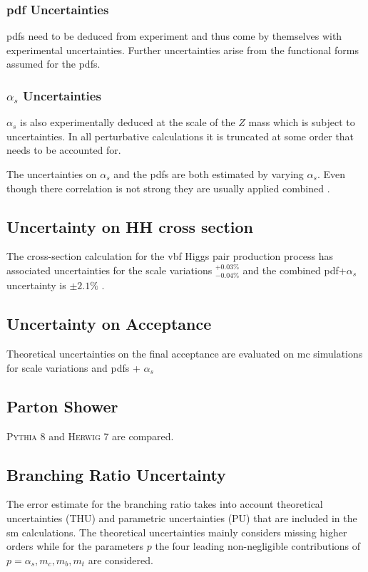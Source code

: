 \subsubsection*{\ac{pdf} Uncertainties}
\acp{pdf} need to be deduced from experiment and thus come by themselves with experimental uncertainties. Further uncertainties arise from the functional forms assumed for the \acp{pdf}.

\subsubsection*{$\alpha_s$ Uncertainties}
$\alpha_s$ is also experimentally deduced at the scale of the $Z$ mass which is subject to uncertainties. In all perturbative calculations it is truncated at some order that needs to be accounted for. 

The uncertainties on $\alpha_s$ and the \acp{pdf} are both estimated by varying $\alpha_s$. Even though there correlation is not strong they are usually applied combined \citep{unc_recipe}.

\subsection{Uncertainty on HH cross section}
The cross-section calculation for the \ac{vbf} Higgs pair production process has associated uncertainties for the scale variations $^{+0.03\%}_{-0.04\%}$ and the combined \ac{pdf}+$\alpha_s$ uncertainty is $\pm 2.1\%$ \citep{de2016arxiv}. 

\subsection{Uncertainty on Acceptance}
Theoretical uncertainties on the final acceptance are evaluated on \ac{mc} simulations for scale variations and \acp{pdf} + $\alpha_s$  

\subsection{Parton Shower}
\textsc{Pythia 8} and \textsc{Herwig 7} are compared. 


\subsection{Branching Ratio Uncertainty}
The error estimate for the branching ratio takes into account theoretical uncertainties (THU) and parametric uncertainties (PU) that are included in the \ac{sm} calculations. The theoretical uncertainties mainly considers missing higher orders while for the parameters $p$ the four leading non-negligible contributions of $p=\alpha_s,m_c,m_b,m_t$ are considered.

